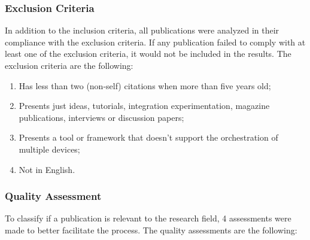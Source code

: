 \subsubsection{Exclusion Criteria}\label{sec:exclusion}

In addition to the inclusion criteria, all publications were analyzed in their compliance with the exclusion criteria. If any publication failed to comply with at least one of the exclusion criteria, it would not be included in the results. The exclusion criteria are the following:

\begin{enumerate}
    \item Has less than two (non-self) citations when more than five years old;
    \item Presents just ideas, tutorials, integration experimentation, magazine publications, interviews or discussion papers;
    \item Presents a tool or framework that doesn't support the orchestration of multiple devices;
    \item Not in English.
\end{enumerate}{}

\subsubsection{Quality Assessment}\label{sec:quality_accessment}

To classify if a publication is relevant to the research field, 4 assessments were made to better facilitate the process. The quality assessments are the following:\\

\captionsetup{belowskip=12pt,aboveskip=4pt}
\begin{table}[ht]
    \centering
    \caption{Parameters for measuring the quality of a publication}
    \label{tab:quality_assessment}
\end{table}{}


